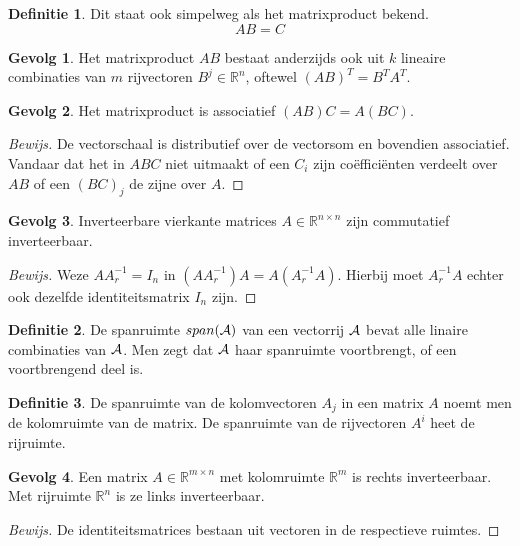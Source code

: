 \documentclass{amsart}
\theoremstyle{definition}
\newtheorem{dfn}{Definitie}[section]
\newtheorem{csq}{Gevolg}[section]
\newenvironment{bewijs}{\begin{proof}[Bewijs]}{\end{proof}}
\newcommand{\realnums}{\mathbb{R}}
\newcommand{\realn}[1][n]{\realnums^{#1}}
\newcommand{\realmx}[2][n]{\realn[#2 \times #1]}
\newcommand{\realnxn}{\realmx{n}}
\newcommand{\realmxn}{\realmx{m}}
\newcommand{\vecrow}[1][a]{\mathcal{\MakeUppercase{#1}}}
\begin{document}
\begin{dfn}
	Dit staat ook simpelweg als het matrixproduct bekend.
	\begin{equation*}
		AB = C
	\end{equation*}
\end{dfn}

\begin{csq}
	Het matrixproduct $AB$ bestaat anderzijds ook uit $k$ lineaire combinaties van $m$ rijvectoren $B^j \in \realn[n]$, oftewel $(AB)^T = B^TA^T$.
\end{csq}

\begin{csq}
	Het matrixproduct is associatief $(AB)C = A(BC)$.
	\begin{bewijs}
		De vectorschaal is distributief over de vectorsom en bovendien associatief.
		Vandaar dat het in $ABC$ niet uitmaakt of een $C_i$ zijn coëfficiënten verdeelt over $AB$ of een $(BC)_j$ de zijne over $A$.
	\end{bewijs}
\end{csq}

\begin{csq}
	Inverteerbare vierkante matrices $A \in \realnxn$ zijn commutatief inverteerbaar.
	\begin{bewijs}
		Weze $AA^{-1}_r = I_n$ in $(AA^{-1}_r)A = A(A^{-1}_rA)$. Hierbij moet $A^{-1}_rA$ echter ook dezelfde identiteitsmatrix $I_n$ zijn.
	\end{bewijs}
\end{csq}

\begin{dfn}
	De spanruimte $span(\vecrow)$ van een vectorrij $\vecrow$ bevat alle linaire combinaties van $\vecrow$.
	Men zegt dat $\vecrow$ haar spanruimte voortbrengt, of een voortbrengend deel is.
\end{dfn}

\begin{dfn}
	De spanruimte van de kolomvectoren $A_j$ in een matrix $A$ noemt men de kolomruimte van de matrix.
	De spanruimte van de rijvectoren $A^i$ heet de rijruimte.
\end{dfn}

\begin{csq}
	Een matrix $A \in \realmxn$ met kolomruimte $\realn[m]$ is rechts inverteerbaar.
	Met rijruimte $\realn$ is ze links inverteerbaar.
	\begin{bewijs}
		De identiteitsmatrices bestaan uit vectoren in de respectieve ruimtes.
	\end{bewijs}
\end{csq}
\end{document}
